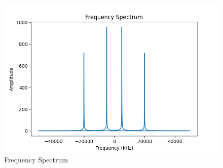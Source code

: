 \documentclass[journal,12pt,twocolumn]{IEEEtran}
\begin{document}
\begin{figure}[ht]
   \centering
   \includegraphics[width=1.1\columnwidth]{2021/BM/32/figs/fig2.png}
   \caption{Frequency Spectrum}
\end{figure}






\end{document}
